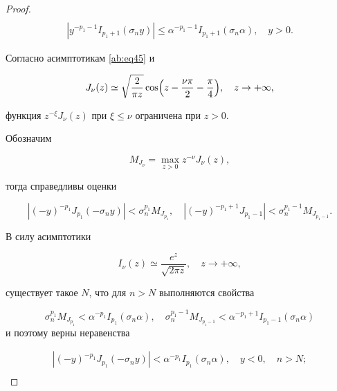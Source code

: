 \begin{proof}
\begin{gather}
\\

\label{ab:eq31}

\left|y^{-p_1-1}I_{p_1+1}(\sigma_ny)\right|\le\alpha^{-p_1-1}I_{p_1+1}(\sigma_n\alpha),\quad y>0.

\end{gather} 



Согласно асимптотикам \eqref{ab:eq45} и \cite[c.~172]{ab:bib:Lebedev} 

$$

J_{\nu}(z)\simeq\sqrt{\frac{2}{\pi z}}\cos\Bigl(z-\frac{\nu\pi}{2}-\frac{\pi}{4}\Bigr), \quad z\to+\infty,

$$

функция $z^{-\xi}J_{\nu}(z)$ при $\xi\le\nu$ ограничена при $z>0$.

Обозначим 

$$M_{J_{\nu}}=\max\limits_{z>0}z^{-\nu}J_{\nu}(z),$$ 

тогда справедливы оценки 

$$

\left|(-y)^{-p_1}J_{p_1}(-\sigma_ny)\right|<\sigma_n^{p_1}M_{J_{p_1}}, \quad \left|(-y)^{-p_1+1}J_{p_1-1}\right|<\sigma_n^{p_1-1}M_{J_{p_1-1}}.

$$ 







В силу асимптотики \cite[c.~173]{ab:bib:Lebedev}

\begin{equation}

\label{ab:eq28}

I_{\nu}(z)\simeq\frac{e^z}{\sqrt{2\pi z}},\quad z\to+\infty,

\end{equation}

существует такое $N$, что для $n>N$ выполняются свойства 

$$

\sigma_n^{p_1}M_{J_{p_1}}<\alpha^{-p_1}I_{p_1}(\sigma_n\alpha), \quad \sigma_n^{p_1-1}M_{J_{p_1-1}}<\alpha^{-p_1+1}I_{p_1-1}(\sigma_n\alpha)$$ и поэтому верны неравенства

\begin{gather}

\label{ab:eq29}

\left|(-y)^{-p_1}J_{p_1}(-\sigma_ny)\right|<\alpha^{-p_1}I_{p_1}(\sigma_n\alpha),\quad y<0,\quad n>N;

\\


\end{gather}
\end{proof}
